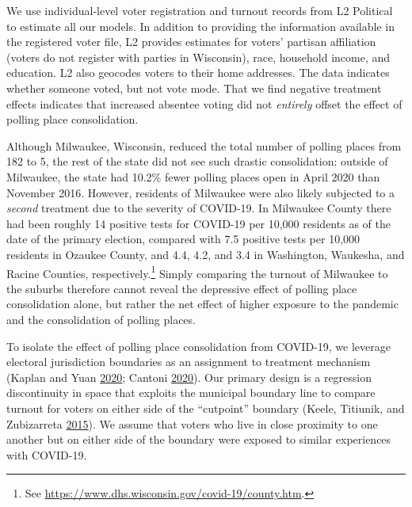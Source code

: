 \documentclass[
  12pt,
]{article}
\begin{document}
We use individual-level voter registration and turnout records from L2 Political to estimate all our models. In addition to providing the information available in the registered voter file, L2 provides estimates for voters' partisan affiliation (voters do not register with parties in Wisconsin), race, household income, and education. L2 also geocodes voters to their home addresses. The data indicates whether someone voted, but not vote mode. That we find negative treatment effects indicates that increased absentee voting did not \emph{entirely} offset the effect of polling place consolidation.

Although Milwaukee, Wisconsin, reduced the total number of polling places from 182 to 5, the rest of the state did not see such drastic consolidation: outside of Milwaukee, the state had 10.2\% fewer polling places open in April 2020 than November 2016. However, residents of Milwaukee were also likely subjected to a \emph{second} treatment due to the severity of COVID-19. In Milwaukee County there had been roughly 14 positive tests for COVID-19 per 10,000 residents as of the date of the primary election, compared with 7.5 positive tests per 10,000 residents in Ozaukee County, and 4.4, 4.2, and 3.4 in Washington, Waukesha, and Racine Counties, respectively.\footnote{See \url{https://www.dhs.wisconsin.gov/covid-19/county.htm}.} Simply comparing the turnout of Milwaukee to the suburbs therefore cannot reveal the depressive effect of polling place consolidation alone, but rather the net effect of higher exposure to the pandemic and the consolidation of polling places.

To isolate the effect of polling place consolidation from COVID-19, we leverage electoral jurisdiction boundaries as an assignment to treatment mechanism (Kaplan and Yuan \protect\hyperlink{ref-Kaplan2020}{2020}; Cantoni \protect\hyperlink{ref-Cantoni2020}{2020}). Our primary design is a regression discontinuity in space that exploits the municipal boundary line to compare turnout for voters on either side of the ``cutpoint'' boundary (Keele, Titiunik, and Zubizarreta \protect\hyperlink{ref-Keele2015}{2015}). We assume that voters who live in close proximity to one another but on either side of the boundary were exposed to similar experiences with COVID-19.
\end{document}
